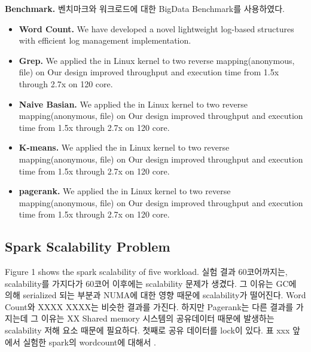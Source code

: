 \fi

\ifkor
\noindent
\textbf{Benchmark.} 벤치마크와 워크로드에 대한 BigData Benchmark를 사용하였다.
\begin{itemize}
\item \textbf{Word Count. }We have developed a novel lightweight log-based
structures with efficient log management implementation.
\item \textbf{Grep. }
We applied the in Linux kernel to two reverse mapping(anonymous, file) on
Our design improved throughput and execution time from 1.5x through 2.7x on 120 core.
\item \textbf{Naive Basian. }
We applied the in Linux kernel to two reverse mapping(anonymous, file) on
Our design improved throughput and execution time from 1.5x through 2.7x on 120 core.
\item \textbf{K-means. }
We applied the in Linux kernel to two reverse mapping(anonymous, file) on
Our design improved throughput and execution time from 1.5x through 2.7x on 120 core.
\item \textbf{pagerank. }
We applied the in Linux kernel to two reverse mapping(anonymous, file) on
Our design improved throughput and execution time from 1.5x through 2.7x on 120 core.
\end{itemize}


\else

\fi

\subsection{Spark Scalability Problem}


\ifkor
Figure 1 shows the spark scalability of five workload.
실험 결과 60코어까지는, scalability를 가지다가 60코어 이후에는 scalability 문제가 생겼다.
그 이유는 GC에 의해 serialized 되는 부분과 NUMA에 대한 영향 때문에 scalability가 떨어진다.
Word Count와 XXXX XXXX는 비슷한 결과를 가진다.
하지만 Pagerank는 다른 결과를 가지는데 그 이유는 XX
Shared memory 시스템의 공유데이터 때문에 발생하는 scalability 저해 요소 때문에 필요하다.
첫째로 공유 데이터를 lock이 있다. 표 xxx 앞에서 실험한 spark의 wordcount에 대해서 .
\else

